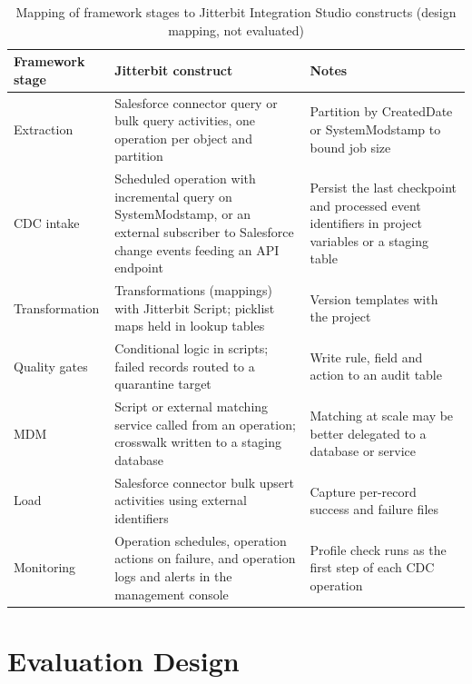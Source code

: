 \begin{table}[htbp]
\centering
\caption{Mapping of framework stages to Jitterbit Integration Studio constructs (design mapping, not evaluated)}
\label{tab:2}
\setlength{\tabcolsep}{4pt}
\renewcommand{\arraystretch}{1.15}
\footnotesize
\begin{tabular}{>{\raggedright\arraybackslash\hspace{0pt}}p{}>{\raggedright\arraybackslash\hspace{0pt}}p{}>{\raggedright\arraybackslash\hspace{0pt}}p{}}
\hline
\textbf{Framework stage} & \textbf{Jitterbit construct} & \textbf{Notes} \\
\hline
Extraction & Salesforce connector query or bulk query activities, one operation per object and partition & Partition by CreatedDate or SystemModstamp to bound job size \\
CDC intake & Scheduled operation with incremental query on SystemModstamp, or an external subscriber to Salesforce change events feeding an API endpoint & Persist the last checkpoint and processed event identifiers in project variables or a staging table \\
Transformation & Transformations (mappings) with Jitterbit Script; picklist maps held in lookup tables & Version templates with the project \\
Quality gates & Conditional logic in scripts; failed records routed to a quarantine target & Write rule, field and action to an audit table \\
MDM & Script or external matching service called from an operation; crosswalk written to a staging database & Matching at scale may be better delegated to a database or service \\
Load & Salesforce connector bulk upsert activities using external identifiers & Capture per-record success and failure files \\
Monitoring & Operation schedules, operation actions on failure, and operation logs and alerts in the management console & Profile check runs as the first step of each CDC operation \\
\hline
\end{tabular}
\end{table}


\section{Evaluation Design}\label{sec:4}

